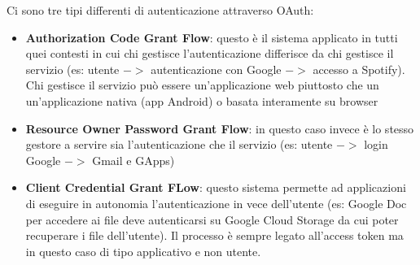 Ci sono tre tipi differenti di autenticazione attraverso OAuth:
\begin{itemize}[noitemsep]
    \item \textbf{Authorization Code Grant Flow}: questo è il sistema applicato in tutti quei contesti in cui chi gestisce l'autenticazione differisce da chi gestisce il servizio (es: utente $->$ autenticazione con Google $->$ accesso a Spotify). Chi gestisce il servizio può essere un'applicazione web piuttosto che un un'applicazione nativa (app Android) o basata interamente su browser
    \item \textbf{Resource Owner Password Grant Flow}: in questo caso invece è lo stesso gestore a servire sia l'autenticazione che il servizio (es: utente $->$ login Google $->$ Gmail e GApps)
    \item \textbf{Client Credential Grant FLow}: questo sistema permette ad applicazioni di eseguire in autonomia l'autenticazione in vece dell'utente (es: Google Doc per accedere ai file deve autenticarsi su Google Cloud Storage da cui poter recuperare i file dell'utente). Il processo è sempre legato all'access token ma in questo caso di tipo applicativo e non utente.
\end{itemize}
